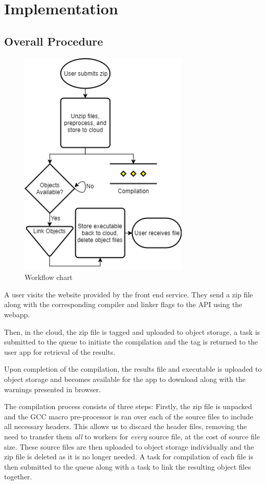 \documentclass[conference]{IEEEtran}
\begin{document}

\section{Implementation}
\subsection{Overall Procedure}
\begin{figure}[ht] %
    \centering
    \includegraphics[width=3.2in]{WorkArchitecture.png}
    \caption{Workflow chart}
    \label{fig:overview}
\end{figure}

A user visits the website provided by the front end service. They send a zip
file along with the corresponding compiler and linker flags to the API using
the webapp.

Then, in the cloud, the zip file is tagged and uploaded to object storage, a
task is submitted to the queue to initiate the compilation and the tag is
returned to the user app for retrieval of the results.

Upon completion of the compilation, the results file and executable is uploaded
to object storage and becomes available for the app to download along with the
warnings presented in browser.

The compilation process consists of three steps:
Firstly, the zip file is unpacked and the GCC macro pre-processor is ran over each of
the source files to include all necessary headers. This allows us to discard the
header files, removing the need to transfer them \emph{all} to workers for
\emph{every} source file, at the cost of source file size. These source files
are then uploaded to object storage individually and the zip file is deleted as it is no longer needed. A task for compilation of each file is then submitted to the queue along with a task to link the resulting object files together.
\end{document}
